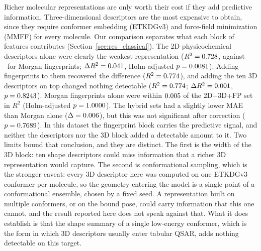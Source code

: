 Richer molecular representations are only worth their cost if they add predictive information. Three-dimensional descriptors are the most expensive to obtain, since they require conformer embedding (ETKDGv3) and force-field minimization (MMFF) for every molecule. Our comparison separates what each block of features contributes (Section~\ref{sec:res_classical}). The 2D physicochemical descriptors alone were clearly the weakest representation ($R^2 = 0.728$, against \MorganRTwoMean\ for Morgan fingerprints; $\Delta R^2 = 0.041$, Holm-adjusted $p = 0.0081$). Adding fingerprints to them recovered the difference ($R^2 = 0.774$), and adding the ten 3D descriptors on top changed nothing detectable ($R^2 = 0.774$; $\Delta R^2 = 0.001$, $p = 0.8243$). Morgan fingerprints alone were within $0.005$ of the 2D+3D+FP set in $R^2$ (Holm-adjusted $p = 1.0000$). The hybrid sets had a slightly lower MAE than Morgan alone ($\Delta = 0.006$), but this was not significant after correction ($p = 0.7689$). In this dataset the fingerprint block carries the predictive signal, and neither the descriptors nor the 3D block added a detectable amount to it. Two limits bound that conclusion, and they are distinct. The first is the width of the 3D block: ten shape descriptors could miss information that a richer 3D representation would capture. The second is conformational sampling, which is the stronger caveat: every 3D descriptor here was computed on one ETKDGv3 conformer per molecule, so the geometry entering the model is a single point of a conformational ensemble, chosen by a fixed seed. A representation built on multiple conformers, or on the bound pose, could carry information that this one cannot, and the result reported here does not speak against that. What it does establish is that the shape summary of a single low-energy conformer, which is the form in which 3D descriptors usually enter tabular QSAR, adds nothing detectable on this target.

